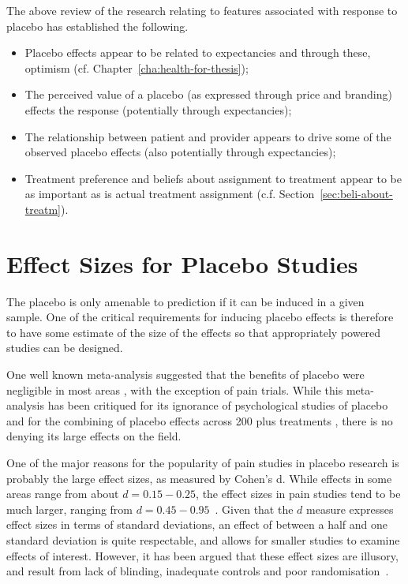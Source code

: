 The above review of the  research relating to features associated with response to placebo has established the following. 
\begin{itemize}
\item Placebo effects appear to be related to expectancies and through these, optimism (cf. Chapter~\ref{cha:health-for-thesis});
\item The perceived value of a placebo (as expressed through price and branding) effects the response (potentially through expectancies);
\item The relationship between patient and provider appears to drive some of the observed placebo effects (also potentially through expectancies);
\item Treatment preference and beliefs about assignment to treatment appear to be as important as is actual treatment assignment (c.f. Section~\ref{sec:beli-about-treatm}).
\end{itemize}

\section{Effect Sizes for Placebo Studies}
\label{sec:effect-sizes-placebo}
The placebo is only amenable to prediction if it can be induced in a given sample. One of the critical requirements for inducing placebo effects is therefore to have some estimate of the size of the effects so that appropriately powered studies can be designed. 

One well known meta-analysis suggested that the benefits of placebo were negligible in most areas \cite{hrobjartsson2001}, with the exception of pain trials. While this meta-analysis has been critiqued for its ignorance of psychological studies of placebo \cite{Evans2003,Stewart-Williams2004b}  and for the combining of placebo effects across 200 plus treatments \cite{Wickramasekera2001}, there is no denying its large effects on the field. 

One of the major reasons for the popularity of pain studies in placebo research is probably the large effect sizes, as measured by Cohen's d. While effects in some areas range from about $d=0.15-0.25$, the effect sizes in pain studies tend to be much larger, ranging from $d=0.45-0.95$~\cite{Vase2002}. Given that the $d$ measure  expresses effect sizes in terms of standard deviations, an effect of between a half and one standard deviation is quite respectable, and allows for smaller studies to examine effects of interest.  However, it has been argued that these effect sizes are illusory, and result from lack of blinding, inadequate controls and poor randomisation~\cite{hrobjartsson2003,Kienle1997}. 



